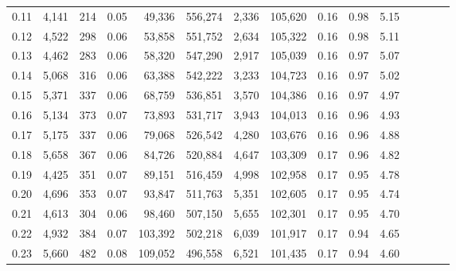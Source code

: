 \begin{tabular}{rrrcrrrrrrrrrrr}
0.11 &   4,141 &    214 &                                       0.05 &   49,336 &  556,274 &    2,336 &  105,620 &  0.16 &  0.98 &                         5.15 \\
0.12 &   4,522 &    298 &                                       0.06 &   53,858 &  551,752 &    2,634 &  105,322 &  0.16 &  0.98 &                         5.11 \\
0.13 &   4,462 &    283 &                                       0.06 &   58,320 &  547,290 &    2,917 &  105,039 &  0.16 &  0.97 &                         5.07 \\
0.14 &   5,068 &    316 &                                       0.06 &   63,388 &  542,222 &    3,233 &  104,723 &  0.16 &  0.97 &                         5.02 \\
0.15 &   5,371 &    337 &                                       0.06 &   68,759 &  536,851 &    3,570 &  104,386 &  0.16 &  0.97 &                         4.97 \\
0.16 &   5,134 &    373 &                                       0.07 &   73,893 &  531,717 &    3,943 &  104,013 &  0.16 &  0.96 &                         4.93 \\
0.17 &   5,175 &    337 &                                       0.06 &   79,068 &  526,542 &    4,280 &  103,676 &  0.16 &  0.96 &                         4.88 \\
0.18 &   5,658 &    367 &                                       0.06 &   84,726 &  520,884 &    4,647 &  103,309 &  0.17 &  0.96 &                         4.82 \\
0.19 &   4,425 &    351 &                                       0.07 &   89,151 &  516,459 &    4,998 &  102,958 &  0.17 &  0.95 &                         4.78 \\
0.20 &   4,696 &    353 &                                       0.07 &   93,847 &  511,763 &    5,351 &  102,605 &  0.17 &  0.95 &                         4.74 \\
0.21 &   4,613 &    304 &                                       0.06 &   98,460 &  507,150 &    5,655 &  102,301 &  0.17 &  0.95 &                         4.70 \\
0.22 &   4,932 &    384 &                                       0.07 &  103,392 &  502,218 &    6,039 &  101,917 &  0.17 &  0.94 &                         4.65 \\
0.23 &   5,660 &    482 &                                       0.08 &  109,052 &  496,558 &    6,521 &  101,435 &  0.17 &  0.94 &                         4.60 \\

\end{tabular}
